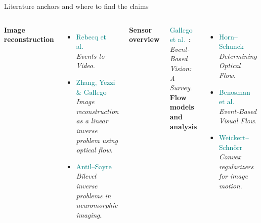 \begin{frame}{Literature anchors and where to find the claims}
\begin{columns}[T]
\footnotesize
\textbf{Image reconstruction}
\begin{itemize}
\item \textcolor{teal}{Rebecq et al.}~\cite{rebecq2019events}\\\emph{Events-to-Video}.
\item \textcolor{teal}{Zhang, Yezzi \& Gallego}~\cite{zhang2021formulating}\\\emph{Image reconstruction as a linear inverse problem using optical flow}.
\item \textcolor{teal}{Antil--Sayre}~\cite{HAntil_DSayre_2023a}\\\emph{Bilevel inverse problems in neuromorphic imaging}.
\end{itemize}
\textbf{Sensor overview}
\par\smallskip\textcolor{teal}{Gallego et al.}~\cite{gallego2022event}: \emph{Event-Based Vision: A Survey}.
\footnotesize
\textbf{Flow models and analysis}
\begin{itemize}
\item \textcolor{teal}{Horn--Schunck}~\cite{horn1981determining}\\\emph{Determining Optical Flow}.
\item \textcolor{teal}{Benosman et al.}~\cite{benosman2014event}\\\emph{Event-Based Visual Flow}.
\item \textcolor{teal}{Weickert--Schn\"orr}~\cite{weickert2001theoretical}\\\emph{Convex regularizers for image motion}.

\end{itemize}
\end{columns}
\end{frame}
